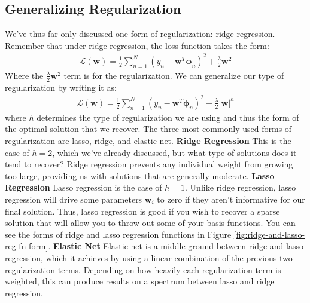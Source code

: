 \subsection{Generalizing Regularization}
We've thus far only discussed one form of regularization: ridge regression. Remember that under ridge regression, the loss function takes the form:
\begin{align*}
    \mathcal{L}(\textbf{w}) = \frac{1}{2} \sum_{n=1}^{N} (y_{n} - \textbf{w}^{T}\boldsymbol{\phi}_{n})^2 + \frac{\lambda}{2}\textbf{w}^{2}
\end{align*}
Where the $\frac{\lambda}{2}\textbf{w}^{2}$ term is for the regularization. We can generalize our type of regularization by writing it as:
\begin{align*}
    \mathcal{L}(\textbf{w}) = \frac{1}{2} \sum_{n=1}^{N} (y_{n} - \textbf{w}^{T}\boldsymbol{\phi}_{n})^2 + \frac{\lambda}{2}\big|\textbf{w}\big|^{h}
\end{align*}
where $h$ determines the type of regularization we are using and thus the form of the optimal solution that we recover. The three most commonly used forms of regularization are lasso, ridge, and elastic net. \newline \newline
\textbf{Ridge Regression} \newline
This is the case of $h = 2$, which we've already discussed, but what type of solutions does it tend to recover? Ridge regression prevents any individual weight from growing too large, providing us with solutions that are generally moderate. \newline \newline
\textbf{Lasso Regression} \newline
Lasso regression is the case of $h = 1$. Unlike ridge regression, lasso regression will drive some parameters $\textbf{w}_{i}$ to zero if they aren't informative for our final solution. Thus, lasso regression is good if you wish to recover a sparse solution that will allow you to throw out some of your basis functions. You can see the forms of ridge and lasso regression functions in Figure \ref{fig:ridge-and-lasso-reg-fn-form}. \newline \newline
\textbf{Elastic Net} \newline
Elastic net is a middle ground between ridge and lasso regression, which it achieves by using a linear combination of the previous two regularization terms. Depending on how heavily each regularization term is weighted, this can produce results on a spectrum between lasso and ridge regression. \\


